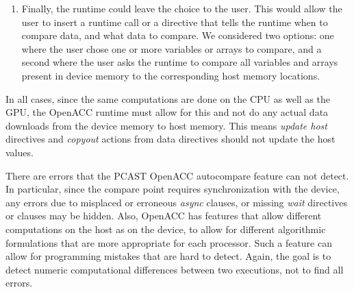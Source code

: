 \begin{enumerate}
\item Finally, the runtime could leave the choice to the user.
This would allow the user to insert a runtime call or a directive that tells the runtime when to compare data, and what data to compare.
We considered two options: one where the user chose one or more variables or arrays to compare, and a second where the user asks the runtime to compare all variables and arrays present in device memory to the corresponding host memory locations.
\end{enumerate}

In all cases, since the same computations are done on the CPU as well as the GPU, the OpenACC runtime must allow for this and not do any actual data downloads from the device memory to host memory.
This means \emph{update host} directives and \emph{copyout} actions from data directives should not update the host values.

There are errors that the PCAST OpenACC autocompare feature can not detect.
In particular, since the compare point requires synchronization with the device, any errors due to misplaced or erroneous \emph{async} clauses, or missing \emph{wait} directives or clauses may be hidden.
Also, OpenACC has features that allow different computations on the host as on the device, to allow for different algorithmic formulations that are more appropriate for each processor.
Such a feature can allow for programming mistakes that are hard to detect.
Again, the goal is to detect numeric computational differences between two executions, not to find all errors.
